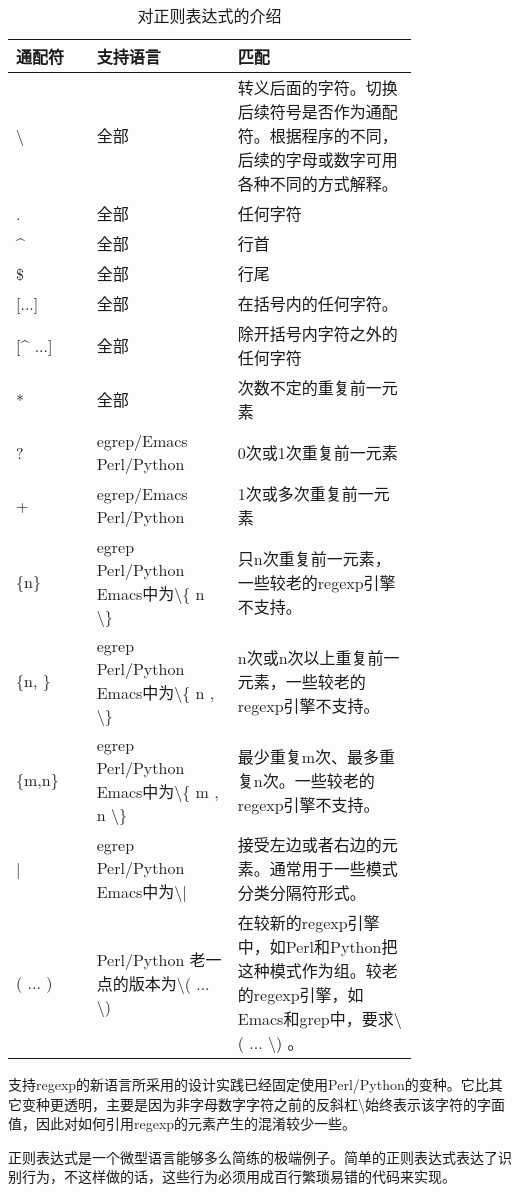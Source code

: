 \documentclass[12pt,oneside]{ctexbook}
\begin{document}
\begin{common-format}
\begin{table}[H]
\centering
\caption{对正则表达式的介绍}
\medskip
\begin{tabular}{@{}lp{0.35\linewidth}p{0.45\linewidth}@{}}
\toprule
通配符 & 支持语言 & 匹配  \\ \midrule
\textbackslash  & 全部 & 转义后面的字符。切换后续符号是否作为通配符。根据程序的不同，后续的字母或数字可用各种不同的方式解释。  \\
.  & 全部 & 任何字符 \\
\^{} & 全部 & 行首 \\
\${}  & 全部 &  行尾 \\{}
[...]  & 全部 & 在括号内的任何字符。\\{}
[\^{} ...] & 全部 & 除开括号内字符之外的任何字符\\
* & 全部 & 次数不定的重复前一元素 \\
? & egrep/Emacs Perl/Python & 0次或1次重复前一元素 \\
+ &  egrep/Emacs Perl/Python & 1次或多次重复前一元素  \\
\{n\} & egrep Perl/Python Emacs中为\textbackslash{}\{ n  \textbackslash  \}  & 只n次重复前一元素，一些较老的regexp引擎不支持。\\
\{n, \} & egrep Perl/Python Emacs中为\textbackslash{}\{ n , \textbackslash  \}  & n次或n次以上重复前一元素，一些较老的regexp引擎不支持。 \\
\{m,n\} & egrep  Perl/Python Emacs中为\textbackslash{}\{ m , n \textbackslash  \}  & 最少重复m次、最多重复n次。一些较老的regexp引擎不支持。 \\
| &  egrep  Perl/Python Emacs中为\textbackslash{}|  & 接受左边或者右边的元素。通常用于一些模式分类分隔符形式。\\
( ... ) &  Perl/Python  老一点的版本为\textbackslash ( ... \textbackslash )  &  在较新的regexp引擎中，如Perl和Python把这种模式作为组。较老的regexp引擎，如Emacs和grep中，要求\textbackslash ( ... \textbackslash ) 。
 \\ \bottomrule
\end{tabular}
\end{table}

支持regexp的新语言所采用的设计实践已经固定使用Perl/Python的变种。它比其它变种更透明，主要是因为非字母数字字符之前的反斜杠\textbackslash 始终表示该字符的字面值，因此对如何引用regexp的元素产生的混淆较少一些。

正则表达式是一个微型语言能够多么简练的极端例子。简单的正则表达式表达了识别行为，不这样做的话，这些行为必须用成百行繁琐易错的代码来实现。


\end{common-format}
\end{document}
